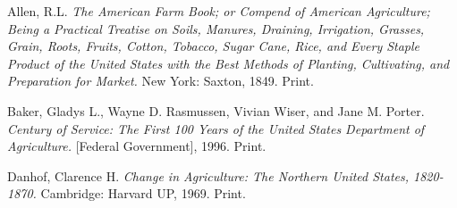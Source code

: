 \bibent
Allen, R.L. \textit{The American Farm Book; or Compend of American Agriculture; Being a Practical Treatise on Soils, Manures, Draining, Irrigation, Grasses, Grain, Roots, Fruits, Cotton, Tobacco, Sugar Cane, Rice, and Every Staple Product of the United States with the Best Methods of Planting, Cultivating, and Preparation for Market.} New York: Saxton, 1849. Print.

\bibent
Baker, Gladys L., Wayne D. Rasmussen, Vivian Wiser, and Jane M. Porter. \textit{Century of Service: The First 100 Years of the United States Department of Agriculture.} [Federal Government], 1996. Print.

\bibent
Danhof, Clarence H. \textit{Change in Agriculture: The Northern United States, 1820-1870.} Cambridge: Harvard UP, 1969. Print.

